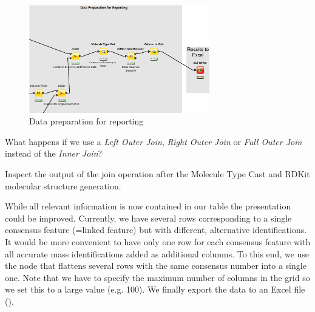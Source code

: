 \begin{figure}[htbp]
  \centering
  \includegraphics[width=0.7\textwidth]{graphics/metabo/reporting_2015.png}
  \caption{Data preparation for reporting}
  \label{fig:reporting}
\end{figure}

\begin{question}
What happens if we use a \textit{Left Outer Join}, \textit{Right Outer Join} or \textit{Full Outer Join} instead of the \textit{Inner Join}?
\end{question}

\begin{task}
Inspect the output of the join operation after the Molecule Type Cast and RDKit molecular structure generation.
\end{task}

While all relevant information is now contained in our table the presentation could be improved.
Currently, we have several rows corresponding to a single consensus feature (=linked feature) but with different, alternative identifications.
It would be more convenient to have only one row for each consensus feature with all accurate mass identifications added as additional columns.
To this end, we use the  node that flattens several rows with the same consensus number into a single one.
Note that we have to specify the maximum number of columns in the grid so we set this to a large value (e.g. 100).
We finally export the data to an Excel file ().

